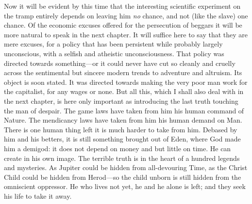 \documentclass{book}
\begin{document}
Now it will be evident by this time that the interesting scientific experiment on the tramp entirely depends on leaving him \emph{no} chance, and not (like the slave) one chance. Of the economic excuses offered for the persecution of beggars it will be more natural to speak in the next chapter. It will suffice here to say that they are mere excuses, for a policy that has been persistent while probably largely unconscious, with a selfish and atheistic unconsciousness. That policy was directed towards something—or it could never have cut so cleanly and cruelly across the sentimental but sincere modern trends to adventure and altruism. Its object is soon stated. It was directed towards making the very poor man work for the capitalist, for any wages or none. But all this, which I shall also deal with in the next chapter, is here only important as introducing the last truth touching the man of despair. The game laws have taken from him his human command of Nature. The mendicancy laws have taken from him his human demand on Man. There is one human thing left it is much harder to take from him. Debased by him and his betters, it is still something brought out of Eden, where God made him a demigod: it does not depend on money and but little on time. He can create in his own image. The terrible truth is in the heart of a hundred legends and mysteries. As Jupiter could be hidden from all-devouring Time, as the Christ Child could be hidden from Herod—so the child unborn is still hidden from the omniscient oppressor. He who lives not yet, he and he alone is left; and they seek his life to take it away.
\end{document}
